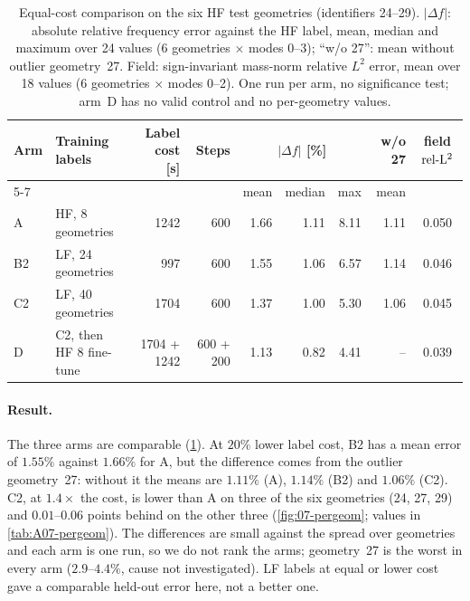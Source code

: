 \begin{table}[!htb]
\centering\footnotesize
\caption{Equal-cost comparison on the six HF test geometries (identifiers 24--29). $|\Delta f|$: absolute relative frequency error against the HF label, mean, median and maximum over 24 values (6 geometries $\times$ modes 0--3); ``w/o 27'': mean without outlier geometry~27. Field: sign-invariant mass-norm relative $L^2$ error, mean over 18 values (6 geometries $\times$ modes 0--2). One run per arm, no significance test; arm~D has no valid control and no per-geometry values.}
\label{tab:equal-cost}
\setlength{\tabcolsep}{4pt}
\begin{tabular}{llrrrrrrc}
\toprule
Arm & Training labels & Label cost [s] & Steps & \multicolumn{3}{c}{$|\Delta f|$ [\%]} & w/o 27 & field $\mathrm{rel\text{-}L^2}$\\
\cmidrule(lr){5-7}
 & & & & mean & median & max & mean & \\
\midrule
A  & HF, 8 geometries  & 1242 & 600 & 1.66 & 1.11 & 8.11 & 1.11 & 0.050\\
B2 & LF, 24 geometries & 997  & 600 & 1.55 & 1.06 & 6.57 & 1.14 & 0.046\\
C2 & LF, 40 geometries & 1704 & 600 & 1.37 & 1.00 & 5.30 & 1.06 & 0.045\\
D  & C2, then HF 8 fine-tune & 1704 + 1242 & 600 + 200 & 1.13 & 0.82 & 4.41 & -- & 0.039\\
\bottomrule
\end{tabular}
\end{table}


\paragraph{Result.} The three arms are comparable (\cref{tab:equal-cost}). At $20\%$ lower label cost, B2 has a mean error of $1.55\%$ against $1.66\%$ for A, but the difference comes from the outlier geometry~27: without it the means are $1.11\%$ (A), $1.14\%$ (B2) and $1.06\%$ (C2).
C2, at $1.4\times$ the cost, is lower than A on three of the six geometries (24, 27, 29) and $0.01$--$0.06$ points behind on the other three (\cref{fig:07-pergeom}; values in \cref{tab:A07-pergeom}). The differences are small against the spread over geometries and each arm is one run, so we do not rank the arms; geometry~27 is the worst in every arm ($2.9$--$4.4\%$, cause not investigated). LF labels at equal or lower cost gave a comparable held-out error here, not a better one.

